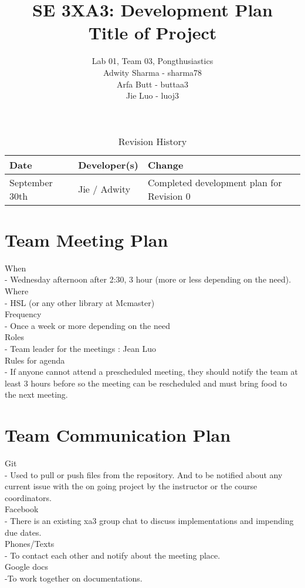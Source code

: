 \documentclass{article}
\title{SE 3XA3: Development Plan\\Title of Project}
\author{Lab 01, Team 03, Pongthusiastics 		
\\ Adwity Sharma - sharma78 		
\\ Arfa Butt - buttaa3 	
	\\ Jie Luo - luoj3 }
\date{}
\begin{document}
 
\begin{table}[hp]
 \caption{Revision History} \label{TblRevisionHistory} 
\begin{tabularx}{\textwidth}{llX} 
\toprule
 \textbf{Date} & \textbf{Developer(s)} & \textbf{Change}\\ 
\midrule 
September 30th & Jie / Adwity & Completed development plan for Revision 0\\ 
\bottomrule
 \end{tabularx} 
\end{table} \newpage \maketitle


\section {Team Meeting Plan} 

When             \\
	- Wednesday afternoon after 2:30, 3 hour (more or less depending on the need).\\
Where            \\
	- HSL (or any other library at Mcmaster) \\
Frequency        \\
	- Once a week or more depending on the need\\
Roles  \\
	- Team leader for the meetings : Jean Luo\\
Rules for agenda \\
	- If anyone cannot attend a prescheduled meeting, they should notify the team at least 3 hours before so the meeting can be rescheduled and must bring food to the next meeting.\\



\section {Team Communication Plan} 

Git          \\
	- Used to pull or push files from the repository. And to be notified about any current issue with the on going project by the instructor or the course coordinators.\\
Facebook     \\
	- There is an existing xa3 group chat to discuss implementations and impending due dates.                         \\        
Phones/Texts \\
	- To contact each other and notify about the meeting place.\\
Google docs  \\
	-To work together on documentations. \\
\end{document}
